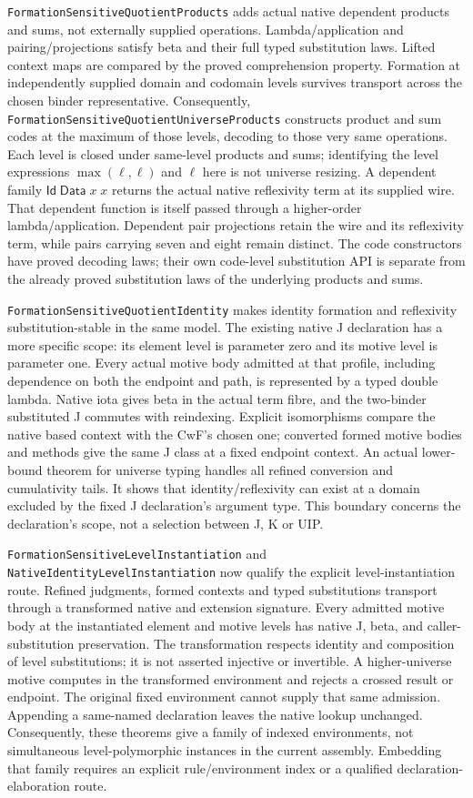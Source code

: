 \documentclass[11pt]{article}
\theoremstyle{definition}
\theoremstyle{remark}
\begin{document}
\nolinkurl{FormationSensitiveQuotientProducts} adds actual native dependent
products and sums, not externally supplied operations. Lambda/application
and pairing/projections satisfy beta and their full typed substitution
laws. Lifted context maps are compared by the proved comprehension property.
Formation at independently supplied domain and codomain levels survives
transport across the chosen binder representative. Consequently,
\nolinkurl{FormationSensitiveQuotientUniverseProducts} constructs product
and sum codes at the maximum of those levels, decoding to those very same
operations. Each level is closed under same-level products and sums;
identifying the level expressions $\max(\ell,\ell)$ and $\ell$ here is not
universe resizing. A dependent family
$\mathsf{Id}\;\mathsf{Data}\;x\;x$ returns the actual native reflexivity
term at its supplied wire. That dependent function is itself passed through
a higher-order lambda/application. Dependent pair projections retain the
wire and its reflexivity term, while pairs carrying seven and eight remain
distinct. The code constructors have proved decoding laws; their own
code-level substitution API is separate from the already proved substitution
laws of the underlying products and sums.

\nolinkurl{FormationSensitiveQuotientIdentity} makes identity formation and
reflexivity substitution-stable in the same model. The existing native J
declaration has a more specific scope: its element level is parameter zero
and its motive level is parameter one. Every actual motive body admitted
at that profile, including dependence on both the endpoint and path, is
represented by a typed double lambda. Native iota gives beta in the actual
term fibre, and the two-binder substituted J commutes with reindexing.
Explicit isomorphisms compare the native based context with the CwF's chosen
one; converted formed motive bodies and methods give the same J class at a
fixed endpoint context. An actual lower-bound theorem for universe typing
handles all refined conversion and cumulativity tails. It shows that
identity/reflexivity can exist at a domain excluded by the fixed J
declaration's argument type. This boundary concerns the declaration's scope,
not a selection between J, K or UIP.

\nolinkurl{FormationSensitiveLevelInstantiation} and
\nolinkurl{NativeIdentityLevelInstantiation} now qualify the explicit
level-instantiation route. Refined judgments, formed contexts and typed
substitutions transport through a transformed native and extension signature.
Every admitted motive body at the instantiated element and motive levels
has native J, beta, and caller-substitution preservation. The transformation
respects identity and composition of level substitutions; it is not asserted
injective or invertible. A higher-universe motive computes in the transformed
environment and rejects a crossed result or endpoint. The original fixed
environment cannot supply that same admission. Appending a same-named
declaration leaves the native lookup unchanged. Consequently, these theorems
give a family of indexed environments, not simultaneous level-polymorphic
instances in the current assembly. Embedding that family requires an explicit
rule/environment index or a qualified declaration-elaboration route.
\end{document}
